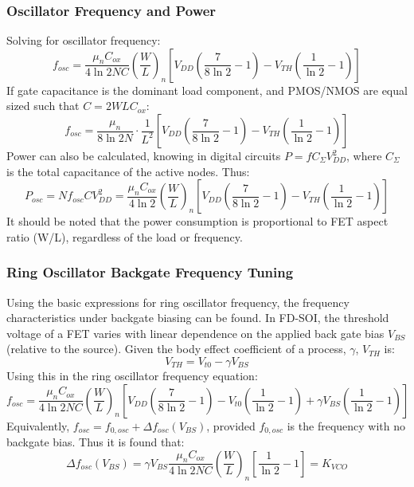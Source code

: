 		\subsubsection{Oscillator Frequency and Power}
			Solving for oscillator frequency:
			\begin{equation}\label{eq:osc_freq_w_l}
				f_{osc} = \frac{\mu_nC_{ox}}{4\ln2NC}\left(\frac{W}{L}\right)_n\left[V_{DD}\left(\frac{7}{8\ln2}-1\right)-V_{TH}\left(\frac{1}{\ln2}-1\right) \right]
			\end{equation}
			If gate capacitance is the dominant load component, and PMOS/NMOS are equal sized such that $C=2WLC_{ox}$:
			\begin{equation}
				f_{osc} = \frac{\mu_n}{8\ln2N}\cdot\frac{1}{L^2}\left[V_{DD}\left(\frac{7}{8\ln2}-1\right)-V_{TH}\left(\frac{1}{\ln2}-1\right) \right]
			\end{equation}
			Power can also be calculated, knowing in digital circuits $P = fC_{\Sigma}V_{DD}^2$, where $C_{\Sigma}$ is the total capacitance of the active nodes. Thus:
			\begin{equation}\label{eq:osc_pow_consumption}
				P_{osc} = Nf_{osc}CV_{DD}^2 = \frac{\mu_nC_{ox}}{4\ln2}\left(\frac{W}{L}\right)_n\left[V_{DD}\left(\frac{7}{8\ln2}-1\right)-V_{TH}\left(\frac{1}{\ln2}-1\right) \right]
			\end{equation}
			It should be noted that the power consumption is proportional to FET aspect ratio (W/L), regardless of the load or frequency.

	\subsubsection{Ring Oscillator Backgate Frequency Tuning}
		Using the basic expressions for ring oscillator frequency, the frequency characteristics under backgate biasing can be found. In FD-SOI, the threshold voltage of a FET varies with linear dependence on the applied back gate bias $V_{BS}$ (relative to the source). Given the body effect coefficient of a process, $\gamma$, $V_{TH}$ is:
		\begin{equation}
			V_{TH} = V_{t0} - \gamma V_{BS}
		\end{equation}
		Using this in the ring oscillator frequency equation:
		\begin{equation}
			f_{osc} = \frac{\mu_nC_{ox}}{4\ln2NC}\left(\frac{W}{L}\right)_n\left[V_{DD}\left(\frac{7}{8\ln2}-1\right)-V_{t0}\left(\frac{1}{\ln2}-1\right) + \gamma V_{BS}\left(\frac{1}{\ln2}-1\right) \right]
		\end{equation}
		Equivalently, $f_{osc} = f_{0,osc} + \Delta f_{osc}(V_{BS})$, provided $f_{0,osc}$ is the frequency with no backgate bias. Thus it is found that:
		\begin{equation}\label{eq:kvco_}
			\Delta f_{osc}(V_{BS}) = \gamma V_{BS}\frac{\mu_nC_{ox}}{4\ln2NC}\left(\frac{W}{L}\right)_n\left[\frac{1}{\ln2}-1\right] = K_{VCO}
		\end{equation}	

